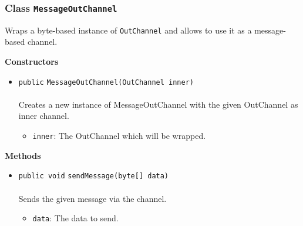 \subsubsection{Class \lstinline|MessageOutChannel|}
Wraps a byte-based instance of \lstinline|OutChannel| and allows to use it as a message-based
 channel. \\
\noindent\begin{minipage}[t]{5cm}
\vspace{0.3em}
\hspace*{2em}
\vspace{0.3em}
\end{minipage}




\textbf{\sffamily Constructors}
\begin{itemize}
\item \lstinline|public| \lstinline|MessageOutChannel|\lstinline|(OutChannel inner)|\\ \\[-0.6em]
Creates a new instance of MessageOutChannel with the given OutChannel as inner channel.
\begin{itemize}
\item \lstinline|inner|: The OutChannel which will be wrapped.
\end{itemize}



\end{itemize}


\textbf{\sffamily Methods}
\begin{itemize}
\item \lstinline|public void| \lstinline|sendMessage|\lstinline|(byte[] data)|\\ \\[-0.6em]
Sends the given message via the channel.
\begin{itemize}
\item \lstinline|data|: The data to send.
\end{itemize}



\end{itemize}

